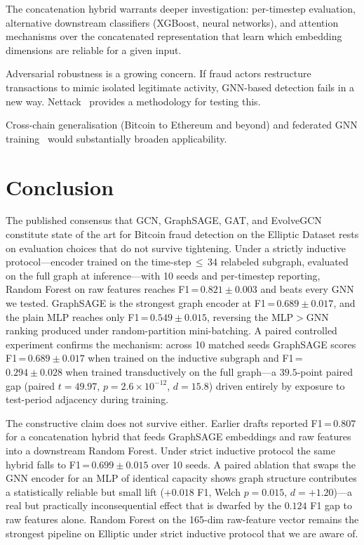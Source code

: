 The concatenation hybrid warrants deeper investigation: per-timestep
evaluation, alternative downstream classifiers (XGBoost, neural
networks), and attention mechanisms over the concatenated representation
that learn which embedding dimensions are reliable for a given input.

Adversarial robustness is a growing concern.  If fraud actors
restructure transactions to mimic isolated legitimate activity,
GNN-based detection fails in a new way.
Nettack~\citep{zugner2018} provides a methodology for testing this.

Cross-chain generalisation (Bitcoin to Ethereum and beyond) and
federated GNN training~\citep{he2021} would substantially broaden
applicability.


\section{Conclusion}
\label{sec:conclusion}

The published consensus that GCN, GraphSAGE, GAT, and EvolveGCN
constitute state of the art for Bitcoin fraud detection on the
Elliptic Dataset rests on evaluation choices that do not survive
tightening.  Under a strictly inductive protocol---encoder trained on
the time-step\,$\le$\,34 relabeled subgraph, evaluated on the full
graph at inference---with 10 seeds and per-timestep reporting,
Random Forest on raw features reaches F1\,=\,$0.821 \pm 0.003$ and
beats every GNN we tested.  GraphSAGE is the strongest graph encoder
at F1\,=\,$0.689 \pm 0.017$, and the plain MLP reaches only
F1\,=\,$0.549 \pm 0.015$, reversing the MLP$>$GNN ranking produced
under random-partition mini-batching.  A paired controlled
experiment confirms the mechanism: across 10 matched seeds
GraphSAGE scores F1\,=\,$0.689 \pm 0.017$ when trained on the
inductive subgraph and F1\,=\,$0.294 \pm 0.028$ when trained
transductively on the full graph---a $39.5$-point paired gap
(paired $t = 49.97$, $p = 2.6 \times 10^{-12}$, $d = 15.8$) driven
entirely by exposure to test-period adjacency during training.

The constructive claim does not survive either.  Earlier drafts
reported F1\,=\,$0.807$ for a concatenation hybrid that feeds
GraphSAGE embeddings and raw features into a downstream Random
Forest.  Under strict inductive protocol the same hybrid falls to
F1\,=\,$0.699 \pm 0.015$ over 10 seeds.  A paired ablation that
swaps the GNN encoder for an MLP of identical capacity shows graph
structure contributes a statistically reliable but small lift
($+0.018$ F1, Welch $p = 0.015$, $d = +1.20$)---a real but
practically inconsequential effect that is dwarfed by the $0.124$
F1 gap to raw features alone.  Random Forest on the 165-dim
raw-feature vector remains the strongest pipeline on Elliptic under
strict inductive protocol that we are aware of.

